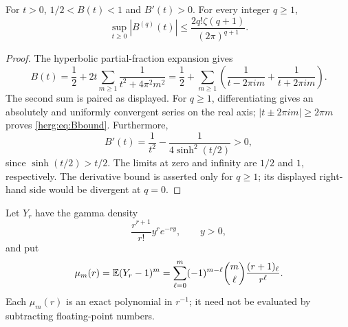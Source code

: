 \begin{lemma}
\label{herg:lem:B}
For $t>0$, $1/2<B(t)<1$ and $B'(t)>0$. For every integer $q\geq1$,
\begin{equation}\label{herg:eq:Bbound}
 \sup_{t\geq0}|B^{(q)}(t)|
 \leq \frac{2q!\zeta(q+1)}{(2\pi)^{q+1}}.
\end{equation}
\end{lemma}
\begin{proof}
The hyperbolic partial-fraction expansion
\cite[Eq.~4.36.3]{herg:DLMFhyperbolic} gives
\begin{equation}\label{herg:eq:Bpartial}
 B(t)=\frac12+2t\sum_{m\geq1}\frac1{t^2+4\pi^2m^2}
 =\frac12+\sum_{m\geq1}
       \left(\frac1{t-2\pi im}+\frac1{t+2\pi im}\right).
\end{equation}
The second sum is paired as displayed. For $q\geq1$, differentiating
gives an absolutely and uniformly convergent series on the real axis;
$|t\pm2\pi im|\geq2\pi m$ proves \eqref{herg:eq:Bbound}.
Furthermore,
\[
 B'(t)=\frac1{t^2}-\frac1{4\sinh^2(t/2)}>0,
\]
since $\sinh(t/2)>t/2$. The limits at zero and infinity are $1/2$
and $1$, respectively. The derivative bound is asserted only for
$q\geq1$; its displayed right-hand side would be divergent at $q=0$.
\end{proof}

Let $Y_r$ have the gamma density
\begin{equation}\label{herg:eq:Ydensity}
 \frac{r^{r+1}}{r!}y^r e^{-ry},\qquad y>0,
\end{equation}
and put
\begin{equation}\label{herg:eq:moments}
 \mu_m(r)=\mathbb E(Y_r-1)^m
 =\sum_{\ell=0}^m(-1)^{m-\ell}\binom m\ell
                         \frac{(r+1)_\ell}{r^\ell}.
\end{equation}
Each $\mu_m(r)$ is an exact polynomial in $r^{-1}$; it need not be
evaluated by subtracting floating-point numbers.

